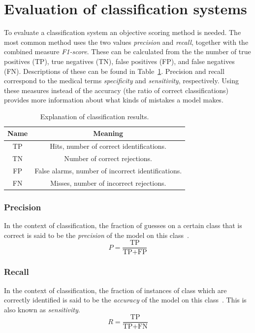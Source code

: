 \documentclass{kththesis}
\begin{document}
\section{Evaluation of classification systems}
To evaluate a classification system an objective scoring method is needed. The most common method uses the two values \textit{precision} and \textit{recall}, together with the combined measure \textit{F1-score}. These can be calculated from the the number of true positives (TP), true negatives (TN), false positives (FP), and false negatives (FN). Descriptions of these can be found in Table~\ref{tab:tp_mm}. Precision and recall correspond to the medical terms \textit{specificity} and \textit{sensitivity}, respectively. Using these measures instead of the accuracy (the ratio of correct classifications) provides more information about what kinds of mistakes a model makes.

\begin{table}[H]
  \begin{center}
    \begin{tabular}{cc}
      \textbf{Name} & \textbf{Meaning} \\
      \toprule
      TP & Hits, number of correct identifications. \\
      TN & Number of correct rejections. \\
      FP & False alarms, number of incorrect identifications. \\
      FN & Misses, number of incorrect rejections.
    \end{tabular}
  \end{center}
  \caption{Explanation of classification results.}
  \label{tab:tp_mm}
\end{table}

\subsubsection{Precision}
In the context of classification, the fraction of guesses on a certain class that is correct is said to be the \textit{precision} of the model on this class~\cite[p.~5]{irbook}.
\[ P = \frac{\text{TP}}{\text{TP} + \text{FP}} \]

\subsubsection{Recall}
In the context of classification, the fraction of instances of class which are correctly identified is said to be the \textit{accuracy} of the model on this class~\cite[p.~5]{irbook}. This is also known as \textit{sensitivity}.
\[ R = \frac{\text{TP}}{\text{TP} + \text{FN}} \]
\end{document}

